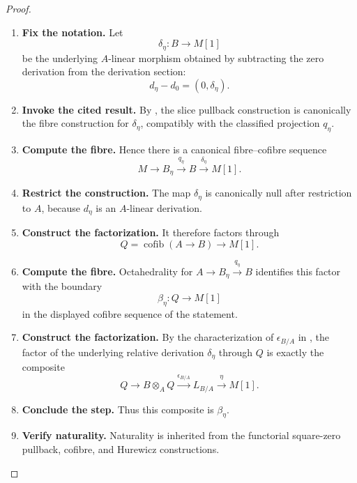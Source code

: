 \begin{proof}
\leavevmode
\begin{enumerate}[label=\textup{(\arabic*)}]
    \item \textbf{Fix the notation.}
    Let
    \[
        \delta_\eta:B\longrightarrow M[1]
    \]
    be the underlying \(A\)-linear morphism obtained by subtracting the zero derivation
    from the derivation section:
    \[
        d_\eta-d_0=(0,\delta_\eta).
    \]

    \item \textbf{Invoke the cited result.}
    By , the slice pullback construction is canonically
    the fibre construction for \(\delta_\eta\), compatibly with the classified projection
    \(q_\eta\).

    \item \textbf{Compute the fibre.}
    Hence there is a canonical fibre--cofibre sequence
    \[
        M
        \longrightarrow
        B_\eta
        \xrightarrow{q_\eta}
        B
        \xrightarrow{\delta_\eta}
        M[1].
    \]

    \item \textbf{Restrict the construction.}
    The map \(\delta_\eta\) is canonically null after restriction to \(A\), because
    \(d_\eta\) is an \(A\)-linear derivation.

    \item \textbf{Construct the factorization.}
    It therefore factors through
    \[
        Q=\operatorname{cofib}(A\to B)
        \longrightarrow
        M[1].
    \]

    \item \textbf{Compute the fibre.}
    Octahedrality for \(A\to B_\eta\xrightarrow{q_\eta}B\) identifies this factor with the boundary
    \[
        \beta_\eta:Q\to M[1]
    \]
    in the displayed cofibre sequence of the statement.

    \item \textbf{Construct the factorization.}
    By the characterization of \(\epsilon_{B/A}\) in , the factor
    of the underlying relative derivation \(\delta_\eta\) through \(Q\) is exactly the
    composite
    \[
        Q\longrightarrow
        B\otimes_AQ
        \xrightarrow{\epsilon_{B/A}}
        L_{B/A}
        \xrightarrow{\eta}
        M[1].
    \]

    \item \textbf{Conclude the step.}
    Thus this composite is \(\beta_\eta\).

    \item \textbf{Verify naturality.}
    Naturality is inherited from the functorial square-zero pullback, cofibre, and Hurewicz
    constructions.
\end{enumerate}
\end{proof}

